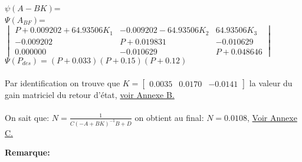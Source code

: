 		\begin{center}
					
			$\psi(A-BK)$=\\$\Psi(A_{BF})$=$\begin{vmatrix}
			P+0.009202+64.93506K_1&-0.009202-64.93506K_2&64.93506K_3\\
			-0.009202&P+0.019831&-0.010629\\
			 0.000000&-0.010629&P+0.048646
			\end{vmatrix}$\\[1.5cm]
			
			$\Psi(P_{des})=(P+0.033)(P+0.15)(P+0.12)$			
			
		\end{center}
		
		\paragraph{} Par identification on trouve que $K=\begin{bmatrix} 0.0035&0.0170&-0.0141\end{bmatrix}$ la valeur du gain matriciel du retour d'état,\label{K} \hyperref[Annexe B]{voir Annexe B.}\\
		
		\paragraph{} On sait que: $N=\frac{1}{C(-A+BK)^{-1}B+D}$ on obtient au final: $N=0.0108$,\label{N} \hyperref[Annexe C]{Voir Annexe C.}
		
		\begin{center}
		\label{fig2}
		\end{center}
		
		\begin{center}
		\label{fig3}
		\end{center}
		\textbf{Remarque:} 
		
		